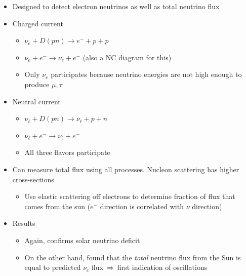 \documentclass[11pt]{article}
\newcommand{\el}{\ensuremath{e^{-}}\xspace}
\newcommand{\thus}{\ensuremath{~\Rightarrow~}}
\begin{document}
\begin{itemize}
\begin{itemize}
    \item Designed to detect electron neutrinos as well as total neutrino flux
    \item Charged current
    \begin{itemize}
      \item $\nu_e +D(pn) \rightarrow \el+p+p$
      \item $\nu_e+\el \rightarrow \nu_e+\el$ (also a NC diagram for this)
      \item Only $\nu_e$ participates because neutrino energies are not high enough to produce $\mu,\tau$
    \end{itemize}
    \item Neutral current
    \begin{itemize}
      \item $\nu_\ell+D(pn)\rightarrow \nu_\ell+p+n$
      \item $\nu_\ell + \el \rightarrow \nu_\ell+\el$
      \item All three flavors participate
    \end{itemize}
    \item Can measure total flux using all processes. Nucleon scattering has higher cross-sections
    \begin{itemize}
      \item Use elastic scattering off electrons to determine fraction of flux that comes from the sun ($\el$ direction is correlated with $\nu$ direction)
    \end{itemize}
    \item Results
    \begin{itemize}
      \item Again, confirms solar neutrino deficit
      \item On the other hand, found that the \emph{total} neutrino flux from the Sun is equal to predicted $\nu_e$ flux\thus first indication of oscillations
    \end{itemize}
  \end{itemize}
\end{itemize}
\end{document}

